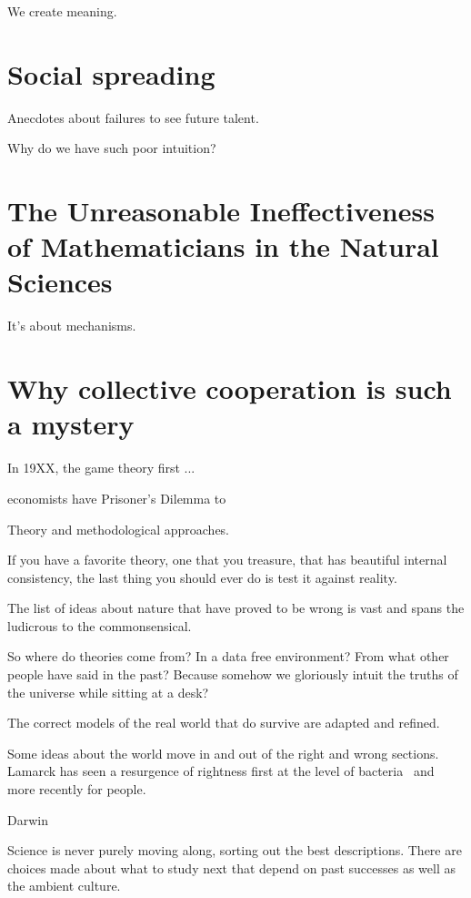 We create meaning.


\section{Social spreading}

Anecdotes about failures to see future talent.

Why do we have such poor intuition?


\section{The Unreasonable Ineffectiveness of Mathematicians in the Natural Sciences}

It's about mechanisms.  

\cite{wigner1960a}

\section{Why collective cooperation is such a mystery}


In 19XX, the game theory first ...


economists 
have Prisoner's Dilemma to 


Theory and methodological approaches.

If you have a favorite theory, one that
you treasure, that has beautiful internal
consistency, the last thing you should ever
do is test it against reality.

The list of ideas about nature that have
proved to be wrong is vast and spans
the ludicrous to the commonsensical.

So where do theories come from?
In a data free environment?
From what other people have said in the past?
Because somehow we gloriously intuit
the truths of the universe while sitting
at a desk?  


The correct models of the real
world that do survive are adapted
and refined.

Some ideas about the world move in
and out of the right and wrong sections.
Lamarck has seen a resurgence of rightness
first at the level of bacteria~\cite{bacteria}
and more recently for people.

Darwin

Science is never purely moving along,
sorting out the best descriptions.
There are choices made about what to
study next that depend on past successes
as well as the ambient culture.


